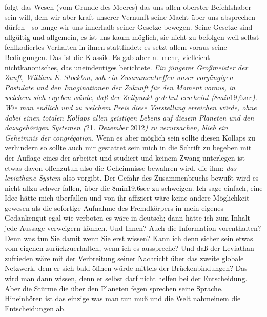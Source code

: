 \documentclass[
]{article}
\begin{document}
folgt das Wesen (vom Grunde des Meeres) das uns allen oberster
Befehlshaber sein will, dem wir aber kraft unserer Vernunft seine Macht
über uns absprechen dürfen - so lange wir uns innerhalb seiner Gesetze
bewegen. Seine Gesetze sind allgültig und allgemein, es ist uns kaum
möglich, sie nicht zu befolgen weil selbst fehlkodiertes Verhalten in
ihnen stattfindet; es setzt allem voraus seine Bedingungen. Das ist die
Klassik. Es gab aber n.~mehr, vielleicht nichtkanonisches, das
uneindeutiges berichtete. \emph{Ein jüngerer Großmeister der Zunft,
William E. Stockton, sah ein Zusammentreffen unser vorgängigen Postulate
und den Imaginationen der Zukunft für den Moment voraus, in welchem sich
ergeben würde, daß der Zeitpunkt gedehnt erscheint
(}8\emph{min}19\emph{,}6\emph{sec). Wie man endlich und zu welchem Preis
diese Vorstellung erreichen würde, ohne dabei einen totalen Kollaps
allen geistigen Lebens auf diesem Planeten und den dazugehörigen
Systemen (}21\emph{. Dezember }2012\emph{) zu verursachen, blieb ein
Geheimnis der congrégation. }Wenn es aber möglich sein sollte diesen
Kollaps zu verhindern so sollte auch mir gestattet sein mich in die
Schrift zu begeben mit der Auflage eines der arbeitet und studiert und
keinem Zwang unterlegen ist etwas davon offenzutun also die Geheimnisse
bewahren wird, die ihm: \emph{das leviathane System} also vorgibt. Der
Gefahr des Zusammenbruchs bewußt wird es nicht allzu schwer fallen, über
die 8min19,6sec zu schweigen. Ich sage einfach, eine Idee hätte mich
überfallen und von ihr affiziert wäre keine andere Möglichkeit gewesen
als die sofortige Aufnahme des Fremdkörpers in mein eigenes Gedankengut
egal wie verboten es wäre in deutsch; dann hätte ich zum Inhalt jede
Aussage verweigern können. Und Ihnen? Auch die Information vorenthalten?
Denn was tun Sie damit wenn Sie erst wissen? Kann ich denn sicher sein
etwas vom eigenen zurückzuerhalten, wenn ich es ausspreche? Und daß der
Leviathan zufrieden wäre mit der Verbreitung seiner Nachricht über das
zweite globale Netzwerk, dem er sich bald öffnen würde mittels der
Brückenbindungen? Das wird man dann wissen, denn er selbst darf nicht
helfen bei der Entscheidung. Aber die Stürme die über den Planeten fegen
sprechen seine Sprache. Hineinhören ist das einzige was man tun muß und
die Welt nahmeinem die Entscheidungen ab.
\end{document}
